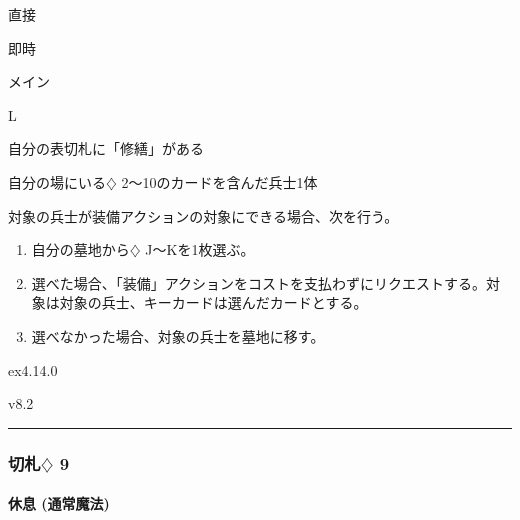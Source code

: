 \documentclass[letterpaper,10pt,dvipdfmx]{sphinxmanual}
\begin{document}
\sphinxAtStartPar
{} 直接

\sphinxAtStartPar
{} 即時

\sphinxAtStartPar
{} メイン

\sphinxAtStartPar
{} L

\sphinxAtStartPar
{}

\sphinxAtStartPar
自分の表切札に「修繕」がある

\sphinxAtStartPar
{}

\sphinxAtStartPar
自分の場にいる{\normalsize $\diamondsuit$} 2〜10のカードを含んだ兵士1体

\sphinxAtStartPar
{}

\sphinxAtStartPar
対象の兵士が装備アクションの対象にできる場合、次を行う。
\begin{enumerate}
%
\item {} 
\sphinxAtStartPar
自分の墓地から{\normalsize $\diamondsuit$} J〜Kを1枚選ぶ。

\item {} 
\sphinxAtStartPar
選べた場合、「装備」アクションをコストを支払わずにリクエストする。対象は対象の兵士、キーカードは選んだカードとする。

\item {} 
\sphinxAtStartPar
選べなかった場合、対象の兵士を墓地に移す。

\end{enumerate}

\sphinxAtStartPar
{}  ex4.14.0

\sphinxAtStartPar
{}  v8.2


\bigskip\hrule\bigskip



\subsubsection{切札{\normalsize $\diamondsuit$} 9}
\label{\detokenize{auto/frameActionlist:id61}}

\paragraph{休息 (通常魔法)}
\label{\detokenize{auto/frameActionlist:act-rest}}\label{\detokenize{auto/frameActionlist:id62}}
\sphinxAtStartPar
{}
\end{document}
